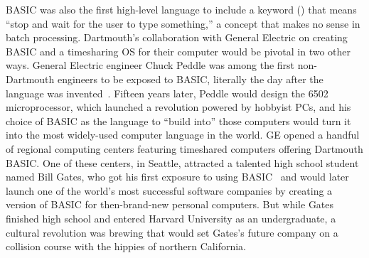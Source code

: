 BASIC was also the first high-level language to include a keyword
() that means ``stop and wait for
the user to type something,'' a concept that makes no sense in batch
processing. 
Dartmouth's collaboration with General Electric on creating BASIC and
a timesharing OS for their computer would be pivotal in two other
ways.
General Electric engineer Chuck Peddle was among the first
non-Dartmouth engineers to be exposed to BASIC, literally the day
after the language was invented~\cite[p.~5]{commodore}.
Fifteen years later, Peddle would design the 6502 microprocessor,
which launched a revolution powered by hobbyist PCs, and his choice of
BASIC as the language to ``build into'' those computers would turn it
into the most widely-used computer language in the world.
GE opened a handful of regional computing centers featuring timeshared
computers offering Dartmouth BASIC.
One of these centers, in Seattle, attracted a talented high school
student named Bill Gates, who got his first exposure to using
BASIC~\cite{basic_history_gdm} and would later launch one of the
world's most successful software companies by creating a
version of BASIC for then-brand-new personal computers.
But while Gates finished high school and entered Harvard University as
an undergraduate, a cultural revolution was brewing that would set
Gates's future company on a collision course with the hippies of
northern California.
